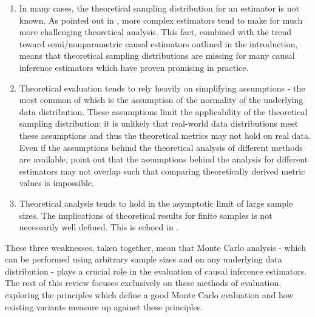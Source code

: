 \documentclass[../main.tex]{subfiles}
\begin{document}
\vspace{\baselineskip}
\begin{enumerate}
    \item In many cases, the theoretical sampling distribution for an estimator is not known. As pointed out in \textcite{Knaus2018MachineEvidence}, more complex estimators tend to make for much more challenging theoretical analysis. This fact, combined with the trend toward semi/nonparametric causal estimators outlined in the introduction, means that theoretical sampling distributions are missing for many causal inference estimators which have proven promising in practice.\par


\vspace{\baselineskip}
    \item Theoretical evaluation tends to rely heavily on simplifying assumptions - the most common of which is the assumption of the normality of the underlying data distribution. These assumptions limit the applicability of the theoretical sampling distribution: it is unlikely that real-world data distributions meet these assumptions and thus the theoretical metrics may not hold on real data. Even if the assumptions behind the theoretical analysis of different methods are available, \textcite{Knaus2018MachineEvidence} point out that the assumptions behind the analysis for different estimators may not overlap such that comparing theoretically derived metric values is impossible.\par


\vspace{\baselineskip}
    \item Theoretical analysis tends to hold in the asymptotic limit of large sample sizes. The implications of theoretical results for finite samples is not necessarily well defined. This is echoed in \textcite{Huber2013TheScore}.
\end{enumerate}\par


\vspace{\baselineskip}
These three weaknesses, taken together, mean that Monte Carlo analysis - which can be performed using arbitrary sample sizes and on any underlying data distribution - plays a crucial role in the evaluation of causal inference estimators. The rest of this review focuses exclusively on these methods of evaluation, exploring the principles which define a good Monte Carlo evaluation and how existing variants measure up against these principles.\par
\end{document}

